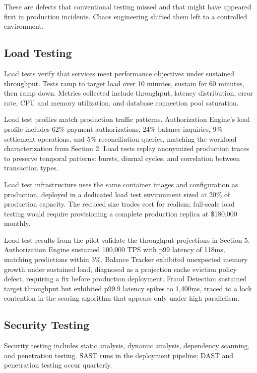 These are defects that conventional testing missed and that might have appeared first in production incidents. Chaos engineering shifted them left to a controlled environment.

\subsection{Load Testing}

Load tests verify that services meet performance objectives under sustained throughput. Tests ramp to target load over 10 minutes, sustain for 60 minutes, then ramp down. Metrics collected include throughput, latency distribution, error rate, CPU and memory utilization, and database connection pool saturation.

Load test profiles match production traffic patterns. Authorization Engine's load profile includes 62\% payment authorizations, 24\% balance inquiries, 9\% settlement operations, and 5\% reconciliation queries, matching the workload characterization from Section 2. Load tests replay anonymized production traces to preserve temporal patterns: bursts, diurnal cycles, and correlation between transaction types.

Load test infrastructure uses the same container images and configuration as production, deployed in a dedicated load test environment sized at 20\% of production capacity. The reduced size trades cost for realism; full-scale load testing would require provisioning a complete production replica at \$180,000 monthly.

Load test results from the pilot validate the throughput projections in Section 5. Authorization Engine sustained 100,000 TPS with p99 latency of 118ms, matching predictions within 3\%. Balance Tracker exhibited unexpected memory growth under sustained load, diagnosed as a projection cache eviction policy defect, requiring a fix before production deployment. Fraud Detection sustained target throughput but exhibited p99.9 latency spikes to 1,400ms, traced to a lock contention in the scoring algorithm that appears only under high parallelism.

\subsection{Security Testing}

Security testing includes static analysis, dynamic analysis, dependency scanning, and penetration testing. SAST runs in the deployment pipeline; DAST and penetration testing occur quarterly.

